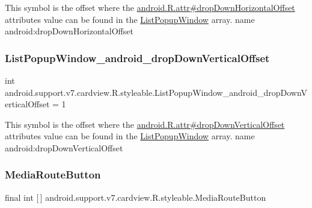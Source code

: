 This symbol is the offset where the \hyperlink{}{android.\+R.\+attr\#drop\+Down\+Horizontal\+Offset} attribute\textquotesingle{}s value can be found in the \hyperlink{classandroid_1_1support_1_1v7_1_1cardview_1_1R_1_1styleable_a7cfe822c983ad9ac00d6f47da2fb0ee4}{List\+Popup\+Window} array.  name android\+:drop\+Down\+Horizontal\+Offset \mbox{\label{classandroid_1_1support_1_1v7_1_1cardview_1_1R_1_1styleable_a20bb7afcc21fceebe839a1c04c8a648b}} 
\subsubsection{\texorpdfstring{List\+Popup\+Window\+\_\+android\+\_\+drop\+Down\+Vertical\+Offset}{ListPopupWindow\_android\_dropDownVerticalOffset}}
{\footnotesize\ttfamily int android.\+support.\+v7.\+cardview.\+R.\+styleable.\+List\+Popup\+Window\+\_\+android\+\_\+drop\+Down\+Vertical\+Offset = 1\hspace{0.3cm}{\ttfamily [static]}}

This symbol is the offset where the \hyperlink{}{android.\+R.\+attr\#drop\+Down\+Vertical\+Offset} attribute\textquotesingle{}s value can be found in the \hyperlink{classandroid_1_1support_1_1v7_1_1cardview_1_1R_1_1styleable_a7cfe822c983ad9ac00d6f47da2fb0ee4}{List\+Popup\+Window} array.  name android\+:drop\+Down\+Vertical\+Offset \mbox{\label{classandroid_1_1support_1_1v7_1_1cardview_1_1R_1_1styleable_a90da384eb909a4e564e04a5ea394df19}} 
\subsubsection{\texorpdfstring{Media\+Route\+Button}{MediaRouteButton}}
{\footnotesize\ttfamily final int \mbox{[}$\,$\mbox{]} android.\+support.\+v7.\+cardview.\+R.\+styleable.\+Media\+Route\+Button\hspace{0.3cm}{\ttfamily [static]}}

